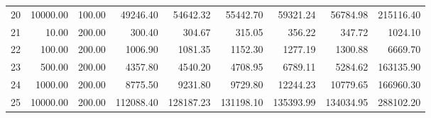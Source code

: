 \begin{table}[ht]
\begin{tabular}{rrrrrrrrr}
  20 & 10000.00 & 100.00 & 49246.40 & 54642.32 & 55442.70 & 59321.24 & 56784.98 & 215116.40 \\ 
  21 & 10.00 & 200.00 & 300.40 & 304.67 & 315.05 & 356.22 & 347.72 & 1024.10 \\ 
  22 & 100.00 & 200.00 & 1006.90 & 1081.35 & 1152.30 & 1277.19 & 1300.88 & 6669.70 \\ 
  23 & 500.00 & 200.00 & 4357.80 & 4540.20 & 4708.95 & 6789.11 & 5284.62 & 163135.90 \\ 
  24 & 1000.00 & 200.00 & 8775.50 & 9231.80 & 9729.80 & 12244.23 & 10779.65 & 166960.30 \\ 
  25 & 10000.00 & 200.00 & 112088.40 & 128187.23 & 131198.10 & 135393.99 & 134034.95 & 288102.20 \\ 
   \hline
\end{tabular}
\end{table}

